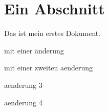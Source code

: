 \documentclass{scrartcl}
\begin{document}
\section{Ein Abschnitt}
Das ist mein erstes Dokument.

mit einer änderung

mit einer zweiten aenderung

aenderung 3

aenderung 4
\end{document}
